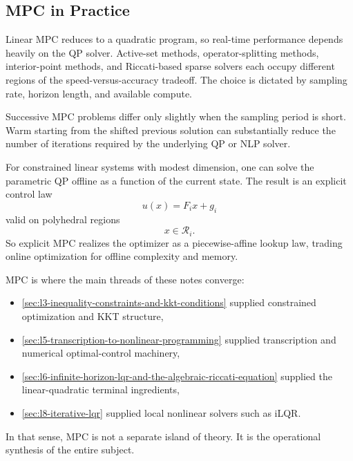 \subsection{MPC in Practice}
\label{sec:l9-mpc-in-practice}

\begin{remark}
	Linear MPC reduces to a quadratic program, so real-time performance depends heavily on the QP solver. Active-set methods, operator-splitting methods, interior-point methods, and Riccati-based sparse solvers each occupy different regions of the speed-versus-accuracy tradeoff. The choice is dictated by sampling rate, horizon length, and available compute.
\end{remark}

\begin{remark}
	Successive MPC problems differ only slightly when the sampling period is short. Warm starting from the shifted previous solution can substantially reduce the number of iterations required by the underlying QP or NLP solver.
\end{remark}

\begin{remark}
	For constrained linear systems with modest dimension, one can solve the parametric QP offline as a function of the current state. The result is an explicit control law
	\[
		u(x)=F_i x + g_i
	\]
	valid on polyhedral regions
	\[
		x \in \mathcal{R}_i.
	\]
	So explicit MPC realizes the optimizer as a piecewise-affine lookup law, trading online optimization for offline complexity and memory.
\end{remark}

\begin{remark}
	MPC is where the main threads of these notes converge:
	\begin{itemize}
		\item \autoref{sec:l3-inequality-constraints-and-kkt-conditions} supplied constrained optimization and KKT structure,
		\item \autoref{sec:l5-transcription-to-nonlinear-programming} supplied transcription and numerical optimal-control machinery,
		\item \autoref{sec:l6-infinite-horizon-lqr-and-the-algebraic-riccati-equation} supplied the linear-quadratic terminal ingredients,
		\item \autoref{sec:l8-iterative-lqr} supplied local nonlinear solvers such as iLQR.
	\end{itemize}
	In that sense, MPC is not a separate island of theory. It is the operational synthesis of the entire subject.
\end{remark}
